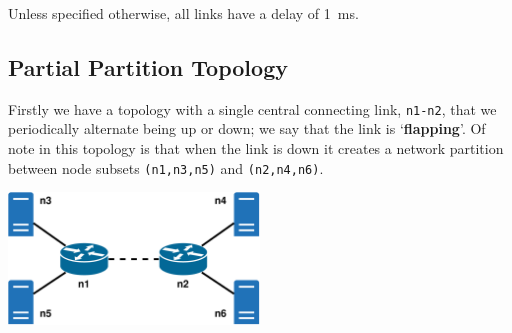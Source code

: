 \documentclass[withindex,glossary,openany]{cam-thesis}
\begin{document}
Unless specified otherwise, all links have a delay of \SI{1}{\ms}.

\subsection{Partial Partition Topology}
\label{subsec:partial_partition}

Firstly we have a topology with a single central connecting link, \texttt{n1-n2}, that we periodically alternate being up or down; we say that the link is `\textbf{flapping}'. Of note in this topology is that when the link is down it creates a network partition between node subsets \texttt{(n1,n3,n5)} and \texttt{(n2,n4,n6)}.

\begin{minipage}{1\textwidth} \centering
	\includegraphics[width=0.5\textwidth]{delay_partition_topology}
	\label{fig:partition_topology}
\end{minipage}
\end{document}
